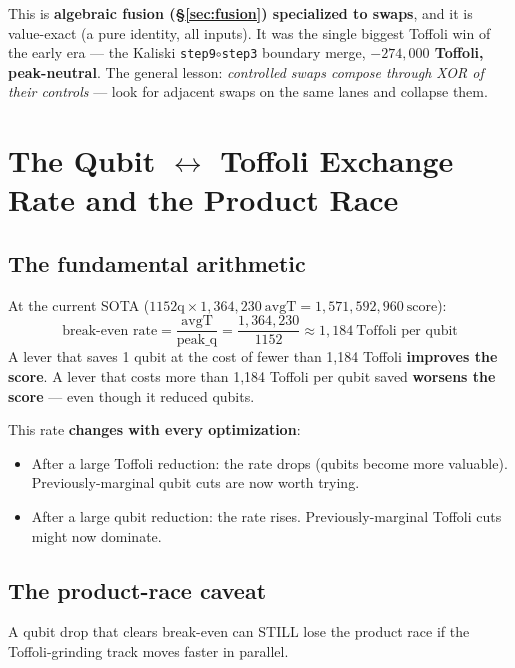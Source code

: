 \documentclass[11pt,a4paper]{article}
\begin{document}
This is \textbf{algebraic fusion (\S\ref{sec:fusion}) specialized to swaps}, and it is value-exact (a
pure identity, all inputs). It was the single biggest Toffoli win of the early era --- the Kaliski
\texttt{step9}$\circ$\texttt{step3} boundary merge, \textbf{$-274{,}000$ Toffoli, peak-neutral}. The
general lesson: \emph{controlled swaps compose through XOR of their controls} --- look for adjacent
swaps on the same lanes and collapse them.

\section{The Qubit $\leftrightarrow$ Toffoli Exchange Rate and the Product Race}
\label{sec:exchange}

\subsection{The fundamental arithmetic}

At the current SOTA ($1152\text{q} \times 1{,}364{,}230\ \text{avgT} = 1{,}571{,}592{,}960\ \text{score}$):
\[
  \text{break-even rate} = \frac{\text{avgT}}{\text{peak\_q}} = \frac{1{,}364{,}230}{1152} \approx 1{,}184\ \text{Toffoli per qubit}
\]
A lever that saves 1 qubit at the cost of fewer than 1,184 Toffoli \textbf{improves the score}.
A lever that costs more than 1,184 Toffoli per qubit saved \textbf{worsens the score} --- even
though it reduced qubits.

This rate \textbf{changes with every optimization}:
\begin{itemize}
  \item After a large Toffoli reduction: the rate drops (qubits become more valuable). Previously-marginal qubit cuts are now worth trying.
  \item After a large qubit reduction: the rate rises. Previously-marginal Toffoli cuts might now dominate.
\end{itemize}

\subsection{The product-race caveat}

A qubit drop that clears break-even can STILL lose the product race if the Toffoli-grinding
track moves faster in parallel.
\end{document}
